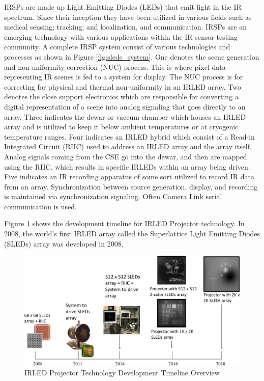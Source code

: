 IRSPs are made up Light Emitting Diodes (LEDs) that emit light in the IR spectrum\cite{biard1966semiconductor}. Since their inception they have been utilized in various fields such as medical\cite{MonteiroEtAl2011,MEEKS1998433,Sadick2009,takhtfooladi2015effects,yamanishi1995respiration} sensing; tracking; and localization\cite{PlotogVladescu2015,Kimon2001,SCHOLZ20151233,WalshDaemsSteckel2015,zeylikovich2003mid}, and communication\cite{CossuEtAl2014,escobosa2004ir,GeorgopoulosKormakopoulos1986,sohn2007localization,JangEtAl2012}. IRSPs are an emerging technology with various applications within the IR sensor testing community. A complete IRSP system consist of various technologies and processes as shown in Figure \ref{fig:sleds_system}. One denotes the scene generation and non-uniformity correction (NUC) process. This is where pixel data representing IR scenes is fed to a system for display. The NUC process is for correcting for physical and thermal non-uniformity in an IRLED array\cite{BarakhshanEtAl2018}. Two denotes the close support electronics which are responsible for converting a digital representation of a scene into analog signaling that goes directly to an array. Three indicates the dewar or vaccum chamber which houses an IRLED array and is utilized to keep it below ambient temperatures or at cryogenic temperature ranges. Four indicates an IRLED hybrid which consist of a Read-in Integrated Circuit (RIIC) used to address an IRLED array and the array itself. Analog signals coming from the CSE go into the dewar, and then are mapped using the RIIC, which results in specific IRLEDs within an array being driven. Five indicates an IR recording apparatus of some sort utilized to record IR data from an array. Synchronization between source generation, display, and recording is maintained via synchronization signaling. Often Camera Link serial communication\cite{CameraLink2000,zhu2008design} is used.


Figure \ref{fig:sleds_timeline} shows the development timeline for IRLED Projector technology. In 2008, the world's first IRLED array called the Superlattice Light Emitting Diodes (SLEDs) array was developed in 2008\cite{FIXME}.

\begin{figure}
    \centering
    \includegraphics[trim=1.5in 0.5in 1.5in 1.5in,width=1.0\textwidth]{fig/sleds_timeline.pdf}
    \caption{IRLED Projector Technology Development Timeline Overview}
    \label{fig:sleds_timeline}
\end{figure}

